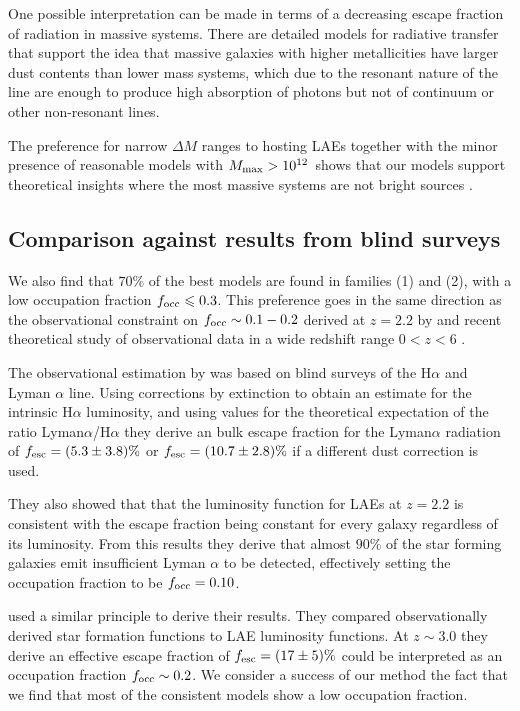 \documentclass[usenatbib]{mn2e}
\newcommand{\ly}{{\ifmmode{{\rm Ly}\alpha}\else{Ly$\alpha$~}\fi}}
\newcommand{\hMsun}{{\ifmmode{h^{-1}{\rm
        {M_{\odot}}}}\else{$h^{-1}{\rm{M_{\odot}}}$}\fi}}
\begin{document}
One possible interpretation can be made in terms of a decreasing escape
fraction of \ly radiation in massive systems. There are detailed models for
radiative transfer that support the idea that massive galaxies with
higher metallicities have larger dust contents than lower mass
systems, which due to the resonant nature of the \ly line are enough
to produce high absorption of \ly photons but not of continuum or
other non-resonant lines.  

The preference for narrow $\Delta M$ ranges to hosting LAEs together
with the minor presence of reasonable models with $M_{\rm max}>
10^{12}$\hMsun \  shows that our models support theoretical insights
where the most massive systems are not bright \ly sources
\citep{ForeroRomero2012}.   

\subsection{Comparison against results from blind surveys}

We also find that $70\%$ of the best models are found in families (1)
and (2), with a low occupation fraction $f_{\rm occ}\leq 0.3$. This
preference goes in the same direction as the observational constraint
on $f_{\rm occ}\sim 0.1-0.2$ derived at $z=2.2$ by \cite{Hayes2010}
and recent theoretical study of observational data in a wide redshift
range $0<z<6$  \citep{Dijkstra2013}. 

The observational estimation by \cite{Hayes2010} was based on blind
surveys of the H$\alpha$ and Lyman $\alpha$ line. Using corrections by
extinction to obtain an estimate for the intrinsic H$\alpha$
luminosity, and using values for the theoretical expectation of the
ratio Lyman$\alpha$/H$\alpha$ they derive an bulk escape fraction for
the Lyman$\alpha$ radiation of $f_{\rm esc}=(5.3\pm 3.8)\%$ or $f_{\rm
  esc}=(10.7\pm 2.8)\%$ if a different dust correction is used. 

They also showed that that the luminosity function for LAEs at $z=2.2$ is
consistent with the escape fraction being constant for every galaxy
regardless of its luminosity. From this results they derive that
almost $90\%$ of the star forming galaxies emit insufficient
Lyman $\alpha$ to be detected, effectively setting the occupation
fraction to be $f_{\rm occ}=0.10$.  

\cite{Dijkstra2013} used a similar principle to derive their results. They
compared observationally derived star formation functions to LAE
luminosity functions. At $z\sim 3.0$ they derive an effective escape
fraction of $f_{\rm esc}=(17\pm 5)\%$ could be interpreted as an
occupation fraction $f_{\rm occ}\sim 0.2$.  We consider a success of
our method the fact that we find that most of the consistent models
show a low occupation fraction.    
\end{document}
